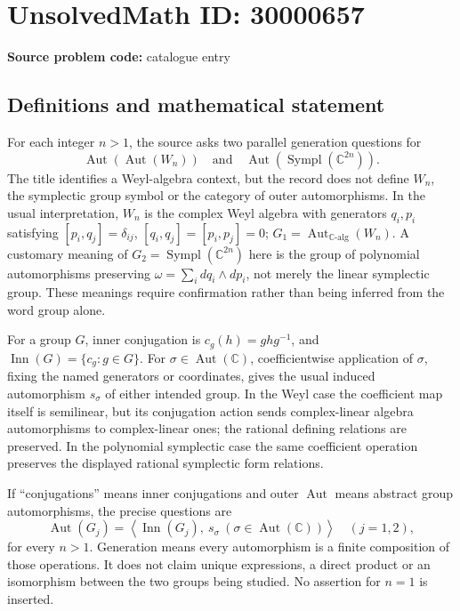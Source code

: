\documentclass[11pt]{article}
\newcommand{\C}{\mathbb{C}}
\begin{document}
\section*{UnsolvedMath ID: 30000657}
\textbf{Source problem code:} catalogue entry
\subsection{Definitions and mathematical statement}
For each integer \(n>1\), the source asks two parallel generation questions for
\[
 \operatorname{Aut}(\operatorname{Aut}(W_n))
 \quad\text{and}\quad
 \operatorname{Aut}(\operatorname{Sympl}(\C^{2n})).
\]
The title identifies a Weyl-algebra context, but the record does not define \(W_n\), the symplectic group symbol or the category of outer automorphisms. In the usual interpretation, \(W_n\) is the complex Weyl algebra with generators \(q_i,p_i\) satisfying \([p_i,q_j]=\delta_{ij}\), \([q_i,q_j]=[p_i,p_j]=0\); \(G_1=\operatorname{Aut}_{\C\text{-}\mathrm{alg}}(W_n)\). A customary meaning of \(G_2=\operatorname{Sympl}(\C^{2n})\) here is the group of polynomial automorphisms preserving \(\omega=\sum_i dq_i\wedge dp_i\), not merely the linear symplectic group. These meanings require confirmation rather than being inferred from the word group alone.

For a group \(G\), inner conjugation is \(c_g(h)=ghg^{-1}\), and \(\operatorname{Inn}(G)=\{c_g:g\in G\}\). For \(\sigma\in\operatorname{Aut}(\C)\), coefficientwise application of \(\sigma\), fixing the named generators or coordinates, gives the usual induced automorphism \(s_\sigma\) of either intended group. In the Weyl case the coefficient map itself is semilinear, but its conjugation action sends complex-linear algebra automorphisms to complex-linear ones; the rational defining relations are preserved. In the polynomial symplectic case the same coefficient operation preserves the displayed rational symplectic form relations.

If ``conjugations'' means inner conjugations and outer \(\operatorname{Aut}\) means abstract group automorphisms, the precise questions are
\[
 \operatorname{Aut}(G_j)=
 \left\langle\operatorname{Inn}(G_j),\ s_\sigma\ (\sigma\in\operatorname{Aut}(\C))\right\rangle
 \quad(j=1,2),
\]
for every \(n>1\). Generation means every automorphism is a finite composition of those operations. It does not claim unique expressions, a direct product or an isomorphism between the two groups being studied. No assertion for \(n=1\) is inserted.
\end{document}
